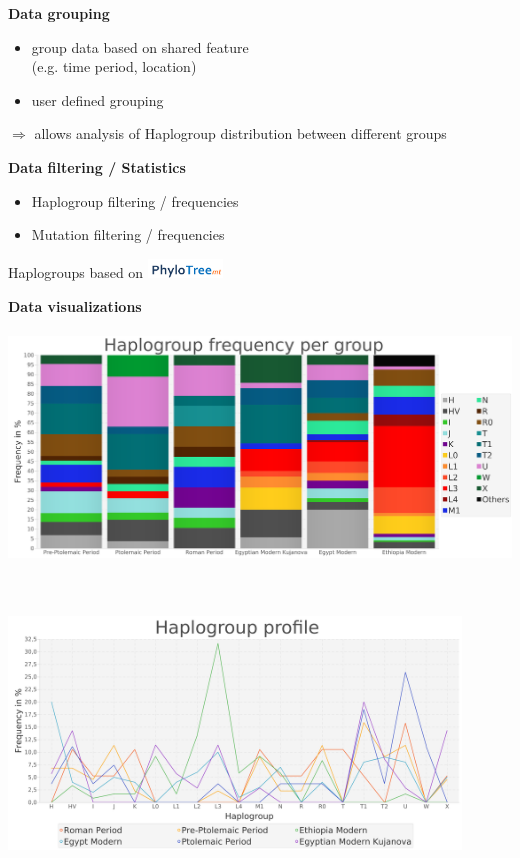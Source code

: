 \documentclass[a0paper,portrait]{baposter}
\begin{document}
\begin{poster}
{	\begin{minipage}[t]{0.5\textwidth}
		\textbf{Data grouping}
		\begin{itemize}[leftmargin=*]
			\item group data based on shared feature \\
			(e.g. time period, location)
			\item user defined grouping
		\end{itemize}
		$\Rightarrow$ allows analysis of Haplogroup distribution between different groups
	\end{minipage}
	\hspace{0.5em}
	\begin{minipage}[t]{0.5\textwidth}
		\textbf{Data filtering / Statistics}
		\begin{itemize}[leftmargin=*]
			\item Haplogroup filtering / frequencies
			\item Mutation filtering / frequencies
		\end{itemize}
		Haplogroups based on \includegraphics[width=2cm]{figures/phylotree.png}
	\end{minipage}

	\vspace{2em}

	\begin{minipage}[t]{0.5\textwidth}
		\textbf{Data visualizations}\\
		\\
		\includegraphics[width=\textwidth, left]{figures/stackedBarchart.png}
	\end{minipage}
	\hspace{0.5em}
	\begin{minipage}[t]{0.5\textwidth}
		\textbf{}\\
		\\
		\includegraphics[width=0.9\textwidth, left]{figures/profile.png}
	\end{minipage}

}
\end{poster}
\end{document}
